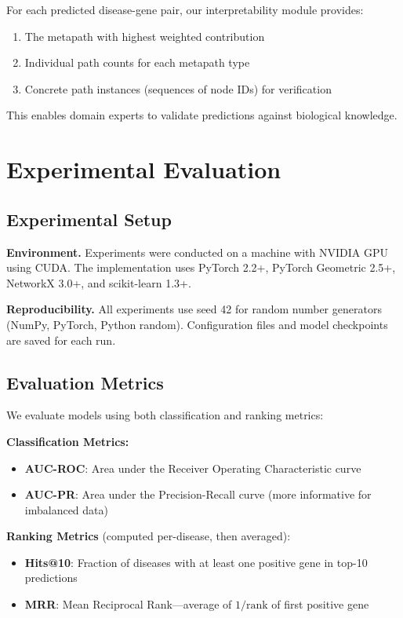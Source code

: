 \documentclass{article}
\begin{document}
For each predicted disease-gene pair, our interpretability module provides:
\begin{enumerate}
    \item The metapath with highest weighted contribution
    \item Individual path counts for each metapath type
    \item Concrete path instances (sequences of node IDs) for verification
\end{enumerate}

This enables domain experts to validate predictions against biological knowledge.

\section{Experimental Evaluation}
\label{sec:experiments}

\subsection{Experimental Setup}

\textbf{Environment.} Experiments were conducted on a machine with NVIDIA GPU using CUDA. The implementation uses PyTorch 2.2+, PyTorch Geometric 2.5+, NetworkX 3.0+, and scikit-learn 1.3+.

\textbf{Reproducibility.} All experiments use seed 42 for random number generators (NumPy, PyTorch, Python random). Configuration files and model checkpoints are saved for each run.

\subsection{Evaluation Metrics}

We evaluate models using both classification and ranking metrics:

\textbf{Classification Metrics:}
\begin{itemize}
    \item \textbf{AUC-ROC}: Area under the Receiver Operating Characteristic curve
    \item \textbf{AUC-PR}: Area under the Precision-Recall curve (more informative for imbalanced data)
\end{itemize}

\textbf{Ranking Metrics} (computed per-disease, then averaged):
\begin{itemize}
    \item \textbf{Hits@10}: Fraction of diseases with at least one positive gene in top-10 predictions
    \item \textbf{MRR}: Mean Reciprocal Rank---average of $1/\text{rank}$ of first positive gene
\end{itemize}
\end{document}
